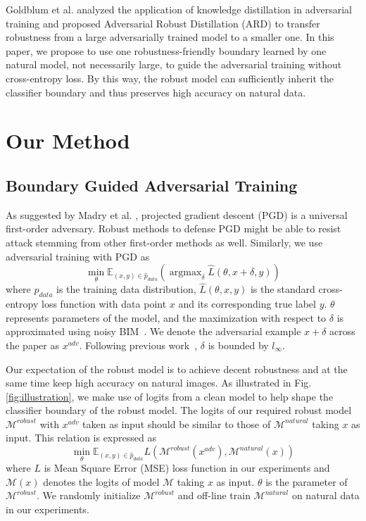 \documentclass[10pt,twocolumn,letterpaper]{article}
\begin{document}
Goldblum et al. \cite{goldblum2019adversarially} analyzed the application of knowledge distillation in adversarial training and proposed Adversarial Robust Distillation (ARD) to transfer robustness from a large adversarially trained model to a smaller one. In this paper, we propose to use one robustness-friendly boundary learned by one natural model, not necessarily large, to guide the adversarial training without cross-entropy loss. By this way, the robust model can sufficiently inherit the classifier boundary and thus preserves high accuracy on natural data.

\section{Our Method}
\subsection{Boundary Guided Adversarial Training}
As suggested by Madry et al. \cite{DBLP:conf/iclr/MadryMSTV18}, projected gradient descent (PGD) is a universal first-order adversary. Robust methods to defense PGD might be able to resist attack stemming from other first-order methods as well. Similarly, we use adversarial training with
PGD as
\begin{equation}
\mathop{\min}_{\theta} \mathbb{E}_{(x,y) \in \hat{p}_{data}} \left( \mathop{\arg \max}_{\delta} \hat{L}(\theta, x+\delta, y) \right)
\end{equation}
where $\hat{p}_{data}$ is the training data distribution,
$\hat{L}(\theta, x, y)$ is the standard cross-entropy loss function with data point $x$ and its corresponding true label $y$. $\theta$ represents parameters of the model, and the maximization with respect to $\delta$ is approximated using noisy BIM~\cite{DBLP:conf/iclr/KurakinGB17a}. We denote the adversarial example $x+\delta$ across the paper as $x^{adv}$. Following previous work~\cite{zhang2019theoretically,DBLP:conf/iclr/MadryMSTV18}, $\delta$ is bounded by $l_{\infty}$.

Our expectation of the robust model is to achieve decent robustness and at the same time keep high accuracy on natural images. 
As illustrated in Fig. \ref{fig:illustration}, we make use of logits from a clean model to help shape the classifier boundary of the robust model. The logits of our required robust model $\mathcal{M}^{robust}$ with $x^{adv}$ taken as input should be similar to those of $\mathcal{M}^{natural}$ taking $x$ as input. This relation is expressed as
\begin{equation}
\mathop{\min}_{\theta} \mathbb{E}_{(x,y) \in \hat{p}_{data}} L\left(\mathcal{M}^{robust}(x^{adv}), \mathcal{M}^{natural}(x)\right) \label{f_BGAT}
\end{equation}
where $L$ is Mean Square Error (MSE) loss function in our experiments and $\mathcal{M}(x)$ denotes the logits of model $\mathcal{M}$ taking $x$ as input. $\theta$ is the parameter of $\mathcal{M}^{robust}$. We randomly initialize $\mathcal{M}^{robust}$ and off-line train $\mathcal{M}^{natural}$ on natural data in our experiments.
\end{document}
